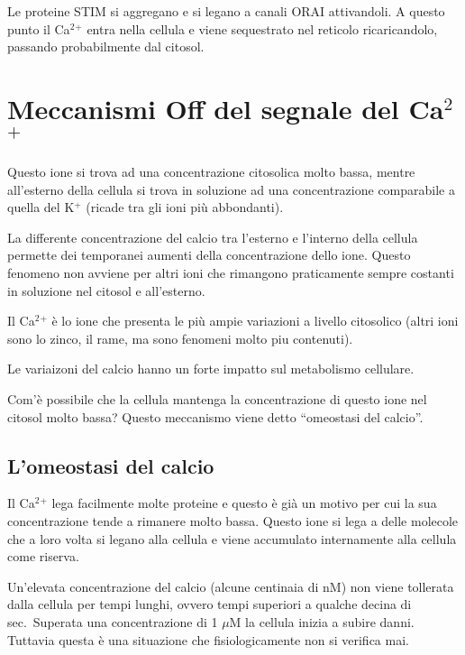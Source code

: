 \documentclass[]{article}
\begin{document}
Le proteine STIM si aggregano e si legano a canali ORAI attivandoli. A
questo punto il Ca\(^2\)\(^+\) entra nella cellula e viene sequestrato
nel reticolo ricaricandolo, passando probabilmente dal citosol.

\section{\texorpdfstring{Meccanismi Off del segnale del
Ca\(^2\)\(^+\)}{Meccanismi Off del segnale del Ca\^{}2\^{}+}}\label{meccanismi-off-del-segnale-del-ca2}

Questo ione si trova ad una concentrazione citosolica molto bassa,
mentre all'esterno della cellula si trova in soluzione ad una
concentrazione comparabile a quella del K\(^+\) (ricade tra gli ioni più
abbondanti).

La differente concentrazione del calcio tra l'esterno e l'interno della
cellula permette dei temporanei aumenti della concentrazione dello ione.
Questo fenomeno non avviene per altri ioni che rimangono praticamente
sempre costanti in soluzione nel citosol e all'esterno.

Il Ca\(^2\)\(^+\) è lo ione che presenta le più ampie variazioni a
livello citosolico (altri ioni sono lo zinco, il rame, ma sono fenomeni
molto piu contenuti).

Le variaizoni del calcio hanno un forte impatto sul metabolismo
cellulare.

Com'è possibile che la cellula mantenga la concentrazione di questo ione
nel citosol molto bassa? Questo meccanismo viene detto ``omeostasi del
calcio''.

\subsection{L'omeostasi del calcio}\label{lomeostasi-del-calcio}

Il Ca\(^2\)\(^+\) lega facilmente molte proteine e questo è già un
motivo per cui la sua concentrazione tende a rimanere molto bassa.
Questo ione si lega a delle molecole che a loro volta si legano alla
cellula e viene accumulato internamente alla cellula come riserva.

Un'elevata concentrazione del calcio (alcune centinaia di nM) non viene
tollerata dalla cellula per tempi lunghi, ovvero tempi superiori a
qualche decina di sec.~Superata una concentrazione di 1 \(\mu\)M la
cellula inizia a subire danni. Tuttavia questa è una situazione che
fisiologicamente non si verifica mai.
\end{document}
